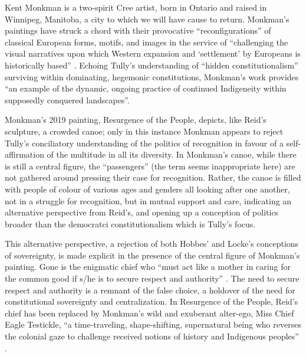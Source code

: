 \documentclass[12pt,oneside]{memoir}
\begin{document}
	Kent Monkman is a two-spirit Cree artist, born in Ontario and raised in Winnipeg, Manitoba, a city to which we will have cause to return. Monkman's paintings have struck a chord with their provocative ``reconfigurations'' of classical European forms, motifs, and images in the service of ``challenging the visual narratives upon which Western expansion and `settlement' by Europeans is historically based'' \citep[181]{Elston2012}. Echoing Tully's understanding of ``hidden constitutionalism'' surviving within dominating, hegemonic constitutions, Monkman's work provides ``an example of the dynamic, ongoing practice of continued Indigeneity within supposedly conquered landscapes''. 
	
Monkman's 2019 painting, Resurgence of the People, depicts, like Reid's sculpture, a crowded canoe; only in this instance Monkman appears to reject Tully's conciliatory understanding of the politics of recognition in favour of a self-affirmation of the multitude in all its diversity. In Monkman's canoe, while there is still a central figure, the ``passengers'' (the term seems inappropriate here) are not gathered around pressing their case for recognition. Rather, the canoe is filled with people of colour of various ages and genders all looking after one another, not in a struggle for recognition, but in mutual support and care, indicating an alternative perspective from Reid's, and opening up a conception of politics broader than the democratci constitutionalism which is Tully's focus.

This alternative perspective, a rejection of both Hobbes' and Locke's conceptions of sovereignty, is made explicit in the presence of the central figure of Monkman's painting. Gone is the enigmatic chief who ``must act like a mother in caring for the common good if s/he is to secure respect and authority'' \citep[25]{Tully1995}. The need to secure respect and authority is a remnant of the false choice, a holdover of the need for constitutional sovereignty and centralization. In Resurgence of the People, Reid's chief has been replaced by Monkman's wild and exuberant alter-ego, Miss Chief Eagle Testickle, ``a time-traveling, shape-shifting, supernatural being who reverses the colonial gaze to challenge received notions of history and Indigenous peoples'' \cite{MonkmanBiography}.
\end{document}

